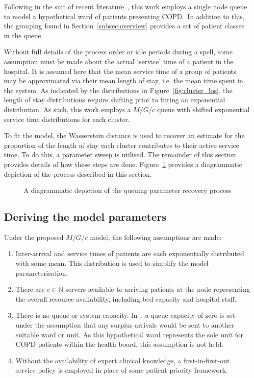 \documentclass[]{interact}
\theoremstyle{plain}%
\theoremstyle{definition}
\theoremstyle{remark}
\begin{document}
Following in the suit of recent literature~\citep{Steins2013,Williams2015}, this
work employs a single node queue to model a hypothetical
ward of patients presenting COPD.\ In addition to this, the grouping found in
Section~\ref{subsec:overview} provides a set of patient classes in the queue.

Without full details of the process order or idle periods during a spell, some
assumption must be made about the actual `service' time of a patient in the
hospital. It is assumed here that the mean service time of a group of patients
may be approximated via their mean length of stay, i.e. the mean time spent in
the system. As indicated by the distributions in Figure~\ref{fig:cluster_los},
the length of stay distributions require shifting prior to fitting an
exponential distribution. As such, this work employs a \(M/G/c\) queue with
shifted exponential service time distributions for each cluster.

To fit the model, the Wasserstein distance is used to recover an estimate for
the proportion of the length of stay each cluster contributes to their active
service time. To do this, a parameter sweep is utilised. The remainder of this
section provides details of how these steps are done. Figure~\ref{fig:process}
provides a diagrammatic depiction of the process described in this section.

\begin{figure}
    \centering%
    \resizebox{!}{.9\textheight}{}
    \caption{%
        A diagrammatic depiction of the queuing parameter recovery process
    }\label{fig:process}
\end{figure}


\subsection{Deriving the model parameters}\label{subsec:derive}

Under the proposed \(M/G/c\) model, the following assumptions are made:

\begin{enumerate}
    \item Inter-arrival and service times of patients are each exponentially
        distributed with some mean. This distribution is used to simplify the
        model parameterisation.
    \item There are \(c \in \mathbb{N}\) servers available to arriving patients
        at the node representing the overall resource availability, including
        bed capacity and hospital staff.
    \item There is no queue or system capacity. In~\cite{Williams2015}, a
        queue capacity of zero is set under the assumption that any surplus
        arrivals would be sent to another suitable ward or unit. As this
        hypothetical ward represents the sole unit for COPD patients within the
        health board, this assumption is not held.
    \item Without the availability of expert clinical knowledge, a
        first-in-first-out service policy is employed in place of some patient
        priority framework.
\end{enumerate}
\end{document}
